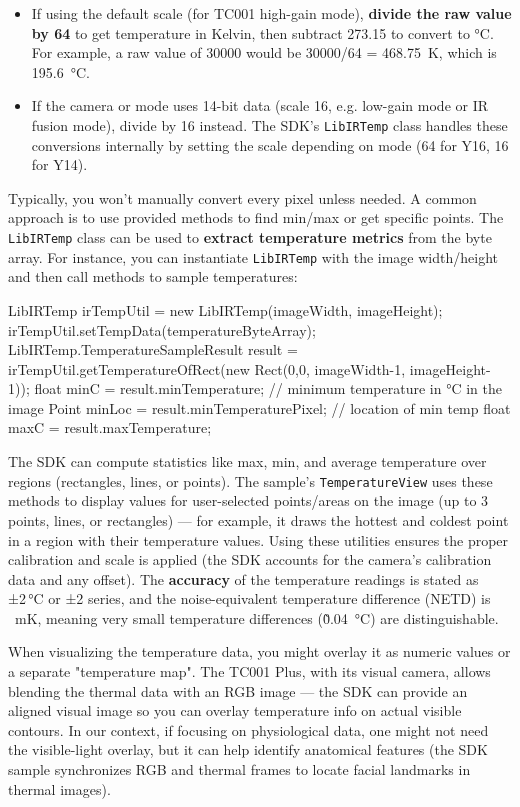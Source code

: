 {\begin{itemize}
\item If using the default scale (for TC001 high-gain mode), \textbf{divide the
  raw value by 64} to get temperature in Kelvin, then subtract 273.15
  to convert to °C. For example, a raw value of 30000 would be 30000/64
  = 468.75 K, which is 195.6 °C.
\item If the camera or mode uses 14-bit data (scale 16, e.g. low-gain mode
  or IR fusion mode), divide by 16
  instead\cite{ref29}.
  The SDK's \texttt{LibIRTemp} class handles these conversions internally by
  setting the scale depending on mode (64 for Y16, 16 for
  Y14)\cite{ref29}.

\end{itemize}
Typically, you won't manually convert every pixel unless needed. A
common approach is to use provided methods to find min/max or get
specific points. The \texttt{LibIRTemp} class can be used to \textbf{extract
temperature metrics} from the byte array. For instance, you can
instantiate \texttt{LibIRTemp} with the image width/height and then call
methods to sample temperatures:

    LibIRTemp irTempUtil = new LibIRTemp(imageWidth, imageHeight);
    irTempUtil.setTempData(temperatureByteArray);
    LibIRTemp.TemperatureSampleResult result = irTempUtil.getTemperatureOfRect(new Rect(0,0, imageWidth-1, imageHeight-1));
    float minC = result.minTemperature;  // minimum temperature in °C in the image
    Point minLoc = result.minTemperaturePixel;  // location of min temp
    float maxC = result.maxTemperature;

The SDK can compute statistics like max, min, and average temperature
over regions (rectangles, lines, or
points)\cite{ref30}\cite{ref31}.
The sample's \texttt{TemperatureView} uses these methods to display values for
user-selected points/areas on the image (up to 3 points, lines, or
rectangles) --- for example, it draws the hottest and coldest point in a
region with their temperature
values\cite{ref32}\cite{ref33}.
Using these utilities ensures the proper calibration and scale is
applied (the SDK accounts for the camera's calibration data and any
offset). The \textbf{accuracy} of the temperature readings is stated as ±2 °C
or ±2%
series\cite{ref34}\cite{ref35},
and the noise-equivalent temperature difference (NETD) is  mK,
meaning very small temperature differences (\~0.04 °C) are
distinguishable\cite{ref2}.

When visualizing the temperature data, you might overlay it as numeric
values or a separate "temperature map". The TC001 Plus, with its visual
camera, allows blending the thermal data with an RGB image --- the SDK
can provide an aligned visual image so you can overlay temperature info
on actual visible
contours\cite{ref4}.
In our context, if focusing on physiological data, one might not need
the visible-light overlay, but it can help identify anatomical features
(the SDK sample synchronizes RGB and thermal frames to locate facial
landmarks in thermal
images\cite{ref36}\cite{ref37}).

}
